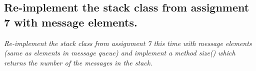 \documentclass[main.tex]{subfiles}
\begin{document}
\subsection*{Re-implement the stack class from assignment 7 with message elements.}
\textit{Re-implement the stack class from assignment 7 this time with message elements (same as
elements in message queue) and implement a method size() which returns the number of the
messages in the stack.}


\end{document}
